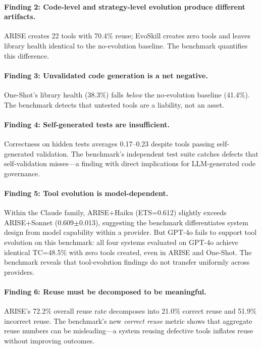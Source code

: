 \documentclass[10pt,twocolumn]{article}
\begin{document}
\paragraph{Finding 2: Code-level and strategy-level evolution produce different artifacts.} ARISE creates 22 tools with 70.4\% reuse; EvoSkill creates zero tools and leaves library health identical to the no-evolution baseline. The benchmark quantifies this difference.

\paragraph{Finding 3: Unvalidated code generation is a net negative.} One-Shot's library health (38.3\%) falls \emph{below} the no-evolution baseline (41.4\%). The benchmark detects that untested tools are a liability, not an asset.

\paragraph{Finding 4: Self-generated tests are insufficient.} Correctness on hidden tests averages 0.17--0.23 despite tools passing self-generated validation. The benchmark's independent test suite catches defects that self-validation misses---a finding with direct implications for LLM-generated code governance.

\paragraph{Finding 5: Tool evolution is model-dependent.} Within the Claude family, ARISE+Haiku (ETS=0.612) slightly exceeds ARISE+Sonnet (0.609$\pm$0.013), suggesting the benchmark differentiates system design from model capability within a provider. But GPT-4o fails to support tool evolution on this benchmark: all four systems evaluated on GPT-4o achieve identical TC=48.5\% with zero tools created, even in ARISE and One-Shot. The benchmark reveals that tool-evolution findings do not transfer uniformly across providers.

\paragraph{Finding 6: Reuse must be decomposed to be meaningful.} ARISE's 72.2\% overall reuse rate decomposes into 21.0\% correct reuse and 51.9\% incorrect reuse. The benchmark's new \emph{correct reuse} metric shows that aggregate reuse numbers can be misleading---a system reusing defective tools inflates reuse without improving outcomes.
\end{document}
